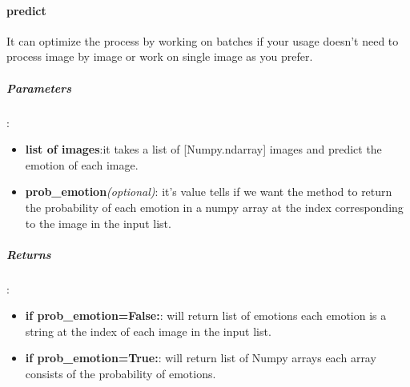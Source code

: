 \begin{comment}
\subparagraph{Usage:}
\begin{changemargin}{0.5cm}{0cm}
\begin{itemize}
\item import the module:
\begin{lstlisting}[language=Python]
from model.emotions_model import *\end{lstlisting}

\item create new object:
\begin{lstlisting}[language=Python]
model = EmotionsModel(
		verbose=False,
		create_new=False,
		use_hog=None,
		use_cnn=None,
		use_lm=None,
		emotions=None
)\end{lstlisting}

\end{itemize}
\end{changemargin}
\end{comment}

\paragraph{predict}It can optimize the process by working on batches if your usage doesn't need to process image by image or work on single image as you prefer.

\subparagraph{Parameters}:
\begin{changemargin}{0.5cm}{0cm}
\begin{itemize}
	\item \textbf{list of images}:it takes a list of [Numpy.ndarray] images and predict the emotion of each image.
	\item \textbf{prob\_emotion}\textit{(optional)}: it's value tells if we want the method to return the probability of each emotion in a numpy array at the index corresponding to the image in the input list. 
\end{itemize}
\end{changemargin}

\subparagraph{Returns}:
\begin{changemargin}{0.5cm}{0cm}
\begin{itemize}[nolistsep]
	\item \textbf{if prob\_emotion=False:}:\newline
	will return list of emotions each emotion is a string at the index of each image in the input list.
	\item \textbf{if prob\_emotion=True:}:\newline
	will return list of Numpy arrays each array consists of the probability of emotions.
\end{itemize}
\end{changemargin}


